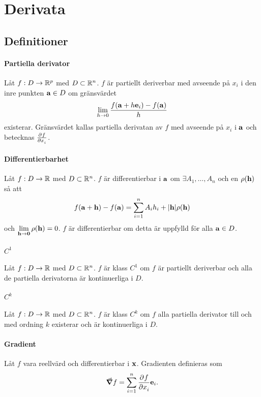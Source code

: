 \section{Derivata}

\subsection{Definitioner}

\paragraph{Partiella derivator}
Låt $f: D\to\mathbb{R}^p$ med $D\subset\mathbb{R}^n$. $f$ är partiellt deriverbar med avseende på $x_i$ i den inre punkten $\vect{a}\in D$ om gränsvärdet
\begin{align*}
	\limit{h}{0}\frac{f(\vect{a} + h\vect{e}_i) - f(\vect{a})}{h}
\end{align*}
existerar. Gränsvärdet kallas partiella derivatan av $f$ med avseende på $x_i$ i $\vect{a}$ och betecknas $\pdeval{f}{x_i}{\vect{a}}$.

\paragraph{Differentierbarhet}
Låt $f: D\to\mathbb{R}$ med $D\subset\mathbb{R}^n$. $f$ är differentierbar i $\vect{a}$ om $\exists A_1, \dots, A_n$ och en $\rho(\vect{h})$ så att
\begin{align*}
	f(\vect{a} + \vect{h}) - f(\vect{a}) = \sum\limits_{i = 1}^{n}A_ih_i + \abs{\vect{h}}\rho(\vect{h})
\end{align*}
och $\limit{\vect{h}}{\vect{0}}\rho(\vect{h}) = 0$. $f$ är differentierbar om detta är uppfylld för alla $\vect{a}\in D$.

\paragraph{$C^1$}
Låt $f: D\to\mathbb{R}$ med $D\subset\mathbb{R}^n$. $f$ är klass $C^1$ om $f$ är partiellt deriverbar och alla de partiella derivatorna är kontinuerliga i $D$.

\paragraph{$C^k$}
Låt $f: D\to\mathbb{R}$ med $D\subset\mathbb{R}^n$. $f$ är klass $C^k$ om $f$ alla partiella derivator till och med ordning $k$ existerar och är kontinuerliga i $D$.

\paragraph{Gradient}
Låt $f$ vara reellvärd och differentierbar i $\vect{x}$. Gradienten definieras som
\begin{align*}
	\grad{f} = \sum\limits_{i = 1}^{n}\pdeval{f}{x_i}{\vect{x}}\vect{e}_i.
\end{align*}

